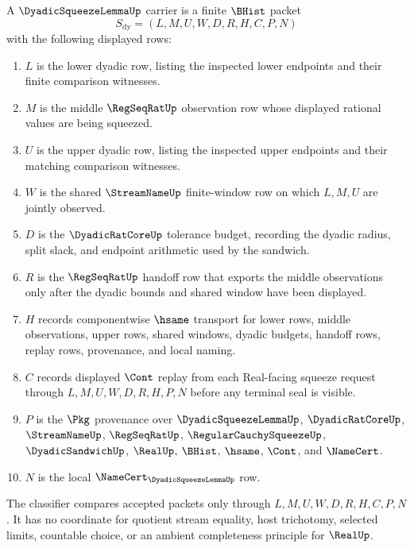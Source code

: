 \begin{definition}
\label{def:dyadic-squeeze-lemma-carrier}
A $\DyadicSqueezeLemmaUp$ carrier is a finite $\BHist$ packet
$$
S_{\mathrm{dy}}=(L,M,U,W,D,R,H,C,P,N)
$$
with the following displayed rows:
\begin{enumerate}
\item $L$ is the lower dyadic row, listing the inspected lower endpoints and their finite comparison witnesses.
\item $M$ is the middle $\RegSeqRatUp$ observation row whose displayed rational values are being squeezed.
\item $U$ is the upper dyadic row, listing the inspected upper endpoints and their matching comparison witnesses.
\item $W$ is the shared $\StreamNameUp$ finite-window row on which $L,M,U$ are jointly observed.
\item $D$ is the $\DyadicRatCoreUp$ tolerance budget, recording the dyadic radius, split slack, and endpoint arithmetic used by the sandwich.
\item $R$ is the $\RegSeqRatUp$ handoff row that exports the middle observations only after the dyadic bounds and shared window have been displayed.
\item $H$ records componentwise $\hsame$ transport for lower rows, middle observations, upper rows, shared windows, dyadic budgets, handoff rows, replay rows, provenance, and local naming.
\item $C$ records displayed $\Cont$ replay from each Real-facing squeeze request through $L,M,U,W,D,R,H,P,N$ before any terminal seal is visible.
\item $P$ is the $\Pkg$ provenance over $\DyadicSqueezeLemmaUp$, $\DyadicRatCoreUp$, $\StreamNameUp$, $\RegSeqRatUp$, $\RegularCauchySqueezeUp$, $\DyadicSandwichUp$, $\RealUp$, $\BHist$, $\hsame$, $\Cont$, and $\NameCert$.
\item $N$ is the local $\NameCert_{\DyadicSqueezeLemmaUp}$ row.
\end{enumerate}
The classifier compares accepted packets only through $L,M,U,W,D,R,H,C,P,N$. It has no coordinate for quotient stream equality, host trichotomy, selected limits, countable choice, or an ambient completeness principle for $\RealUp$.
\end{definition}

